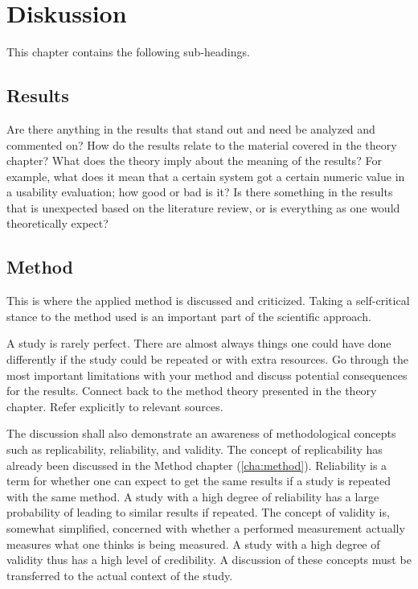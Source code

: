 \chapter{Diskussion}
\label{cha:discussion}

This chapter contains the following sub-headings.

\section{Results}
\label{sec:discussion-results}

Are there anything in the results that stand out and need be
analyzed and commented on? How do the results relate to the
material covered in the theory chapter? What does the theory
imply about the meaning of the results? For example, what
does it mean that a certain system got a certain numeric value
in a usability evaluation; how good or bad is it? Is there
something in the results that is unexpected based on the
literature review, or is everything as one would theoretically
expect?

\section{Method}
\label{sec:discussion-method}

This is where the applied method is discussed and criticized.
Taking a self-critical stance to the method used is an
important part of the scientific approach.

A study is rarely perfect. There are almost always things one
could have done differently if the study could be repeated or
with extra resources. Go through the most important
limitations with your method and discuss potential
consequences for the results. Connect back to the method
theory presented in the theory chapter. Refer explicitly to
relevant sources.

The discussion shall also demonstrate an awareness of methodological
concepts such as replicability, reliability, and validity. The concept
of replicability has already been discussed in the Method chapter
(\ref{cha:method}). Reliability is a term for whether one can expect
to get the same results if a study is repeated with the same method. A
study with a high degree of reliability has a large probability of
leading to similar results if repeated. The concept of validity is,
somewhat simplified, concerned with whether a performed measurement
actually measures what one thinks is being measured. A study with a
high degree of validity thus has a high level of credibility. A
discussion of these concepts must be transferred to the actual context
of the study.

